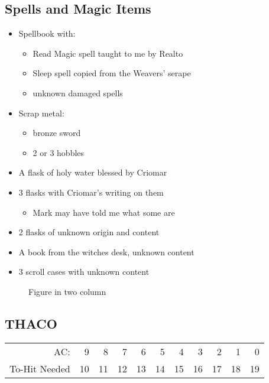 \documentclass[a4paper]{article}
\begin{document}
\begin{multicols}{2}
\section{Spells and Magic Items}
\begin{itemize}[nosep, itemindent=1em, label=-]
  \item Spellbook with:
    \begin{itemize}[nosep, itemindent=1em, label=-]
    \item Read Magic spell taught to me by Realto
    \item Sleep spell copied from the Weavers' serape
    \item unknown damaged spells
  \end{itemize}
\item Scrap metal:
  \begin{itemize}[nosep, itemindent=1em, label=-]
    \item bronze sword
    \item 2 or 3 hobbles
  \end{itemize}
\item A flask of holy water blessed by Criomar
\item 3 flasks with Criomar's writing on them
  \begin{itemize}[nosep, itemindent=1em, label=-]
    \item Mark may have told me what some are
  \end{itemize}
\item 2 flasks of unknown origin and content
\item A book from the witches desk, unknown content
\item 3 scroll cases with unknown content
\end{itemize}

\begin{figure}[H]
  \centering
  \caption{Figure in two column}
\end{figure}
\end{multicols}

\begin{center}
\section{THACO}
\end{center}
\begin{table}[H]
\begin{center}
    \begin{tabular}{r|r|r|r|r|r|r|r|r|r|r} %
      AC: & 9 & 8 & 7 & 6 & 5 & 4 & 3 & 2 & 1 & 0\\
      To-Hit Needed & 10 & 11 & 12 & 13 & 14 & 15 & 16 & 17 & 18 & 19\\
    \end{tabular}
\end{center}
\end{table}
\end{document}
